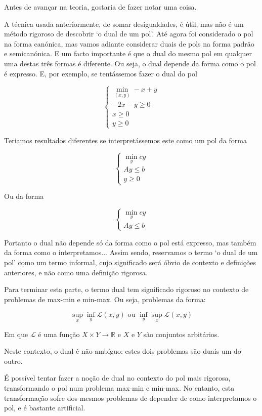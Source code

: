 \documentclass{article}
\newcommand{\R}{\mathbb{R}}
\theoremstyle{definition}
\begin{document}
	Antes de avançar na teoria, gostaria de fazer notar uma coisa.
	
	A técnica usada anteriormente, de somar desigualdades, é útil, mas não é um método rigoroso de descobrir `o dual de um pol'. Até agora foi considerado o pol na forma canónica, mas vamos adiante considerar duais de pols na forma padrão e semicanónica. E um facto importante é que o dual do mesmo pol em qualquer uma destas três formas é diferente. Ou seja, o dual depende da forma como o pol é expresso. E, por exemplo, se tentássemos fazer o dual do pol
	
	\[
	\begin{cases}
	\min\limits_{(x,y)} -x+y\\
	-2x-y \geq 0\\
	x \geq 0\\
	y \geq 0
	\end{cases}
	\]
	
	Teriamos resultados diferentes se interpretássemos este como um pol da forma
	
	\[
	\begin{cases}
	\min\limits_y c y\\
	A y \leq b\\
	y \geq 0
	\end{cases}
	\]
	
	Ou da forma
	
	\[
	\begin{cases}
	\min\limits_y c y\\
	A y \leq b
	\end{cases}
	\]
	
	Portanto o dual não depende só da forma como o pol está expresso, mas também da forma como o interpretamos... Assim sendo, reservamos o termo `o dual de um pol' como um termo informal, cujo significado será óbvio de contexto e definições anteriores, e não como uma definição rigorosa.
	
	Para terminar esta parte, o termo dual tem significado rigoroso no contexto de problemas de max-min e min-max. Ou seja, problemas da forma:
	
	\[\sup\limits_x \inf\limits_y \mathscr{L}(x,y) \text{ ou } \inf\limits_y \sup\limits_x \mathscr{L}(x,y)\]
	
	Em que $\mathscr{L}$ é uma função $X \times Y \rightarrow \R$ e $X$ e $Y$ são conjuntos arbitários.
	
	Neste contexto, o dual é não-ambíguo: estes dois problemas são duais um do outro.
	
	É possível tentar fazer a noção de dual no contexto do pol mais rigorosa, transformando o pol num problema max-min e min-max. No entanto, esta transformação sofre dos mesmos problemas de depender de como interpretamos o pol, e é bastante artificial.
	
\end{document}
